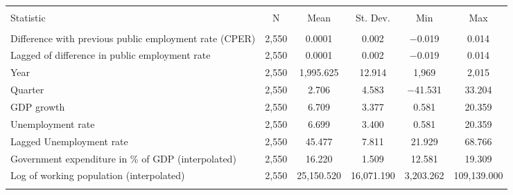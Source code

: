 
\begin{table}[!htbp] \centering 
  \caption{} 
  \label{} 
\footnotesize 
\begin{tabular}{@{\extracolsep{5pt}}lccccc} 
\\[-1.8ex]\hline 
\hline \\[-1.8ex] 
Statistic & \multicolumn{1}{c}{N} & \multicolumn{1}{c}{Mean} & \multicolumn{1}{c}{St. Dev.} & \multicolumn{1}{c}{Min} & \multicolumn{1}{c}{Max} \\ 
\hline \\[-1.8ex] 
Difference with previous public employment rate (CPER) & 2,550 & 0.0001 & 0.002 & $-$0.019 & 0.014 \\ 
Lagged of difference in public employment rate & 2,550 & 0.0001 & 0.002 & $-$0.019 & 0.014 \\ 
Year & 2,550 & 1,995.625 & 12.914 & 1,969 & 2,015 \\ 
Quarter & 2,550 & 2.706 & 4.583 & $-$41.531 & 33.204 \\ 
GDP growth & 2,550 & 6.709 & 3.377 & 0.581 & 20.359 \\ 
Unemployment rate & 2,550 & 6.699 & 3.400 & 0.581 & 20.359 \\ 
Lagged Unemployment rate & 2,550 & 45.477 & 7.811 & 21.929 & 68.766 \\ 
Government expenditure in \% of GDP (interpolated) & 2,550 & 16.220 & 1.509 & 12.581 & 19.309 \\ 
Log of working population (interpolated) & 2,550 & 25,150.520 & 16,071.190 & 3,203.262 & 109,139.000 \\ 
\hline \\[-1.8ex] 
\end{tabular} 
\end{table} 
